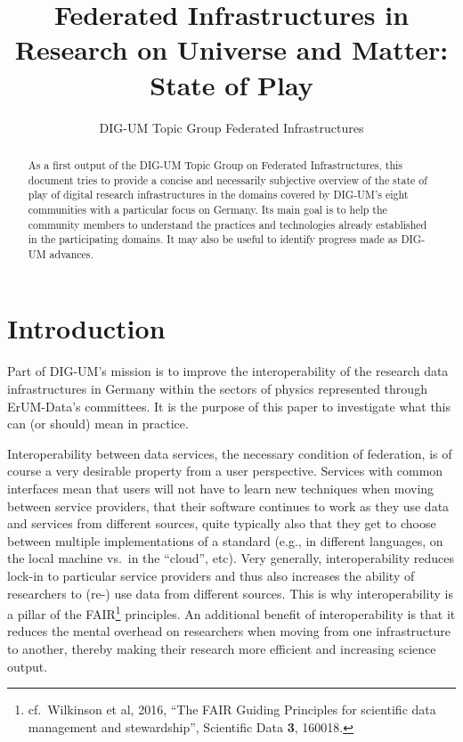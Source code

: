 \documentclass{article}
\title{Federated Infrastructures in Research on Universe and Matter:
State of Play}
\author{DIG-UM Topic Group Federated Infrastructures}
\begin{document}
\maketitle
\begin{abstract}
As a first output of the DIG-UM Topic Group on Federated Infrastructures,
this document tries to provide a concise and necessarily subjective
overview of the state of play of digital research infrastructures in
the domains covered by DIG-UM's eight communities with a particular focus
on Germany.  Its main goal is to
help the community members to understand the practices and technologies
already established in the participating domains.  It may also be useful to
identify progress made as DIG-UM advances.

\end{abstract}

\section{Introduction}

Part of DIG-UM's mission is to improve the interoperability of the
research data infrastructures in Germany within the sectors of physics
represented through ErUM-Data's committees.  It is the purpose of this
paper to investigate what this can (or should) mean in practice.

Interoperability between data services, the necessary condition of
federation,  is of course a very desirable property from a user
perspective.  Services with common interfaces mean that users will not
have to learn new techniques when moving between service providers,
that their software continues to work as they use data and services from
different sources, quite typically also that they
get to choose between multiple implementations of a standard (e.g., in
different languages, on the local machine vs.~in the ``cloud'', etc).
Very generally, interoperability reduces lock-in to particular service
providers and thus also increases the ability of researchers to (re-)
use data from different sources.  This is why interoperability is a
pillar of the FAIR\footnote{cf.~Wilkinson et al, 2016, ``The FAIR
Guiding Principles for scientific data management and stewardship'',
Scientific Data \textbf{3}, 160018.}  principles.  An additional benefit of
interoperability is that it reduces the mental overhead on researchers
when moving from one infrastructure to another, thereby making their
research more efficient and increasing science output.
\end{document}
